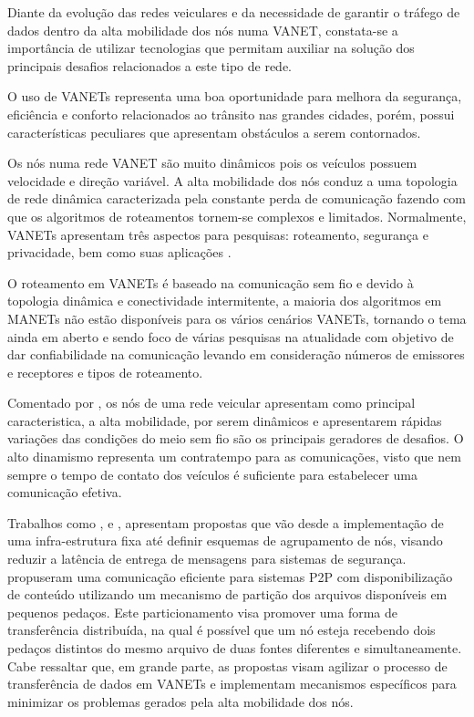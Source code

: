 \documentclass[
	12pt,				%
	oneside,			%
	a4paper,			%
	english,			%
	brazil				%
	]{abntex2ppgsi}
\begin{document}
Diante da evolução das redes veiculares e da necessidade de garantir o tráfego de dados dentro da alta mobilidade dos nós numa VANET, constata-se a importância de utilizar tecnologias que permitam auxiliar na solução dos principais desafios relacionados a este tipo de rede.  

O uso de VANETs representa uma boa oportunidade para melhora da segurança, eficiência e conforto relacionados ao trânsito nas grandes cidades, porém, possui características peculiares que apresentam obstáculos a serem contornados. 

Os nós numa rede VANET são muito dinâmicos pois os veículos possuem velocidade e direção variável. A alta mobilidade dos nós conduz a uma topologia de rede dinâmica caracterizada pela constante perda de comunicação fazendo com que os algoritmos de roteamentos tornem-se complexos e limitados. Normalmente, VANETs apresentam três aspectos para pesquisas: roteamento, segurança e privacidade, bem como suas aplicações \cite{liang2015vehicular}.

O roteamento em VANETs é baseado na comunicação sem fio e devido à topologia dinâmica e conectividade intermitente, a maioria dos algoritmos em MANETs não estão disponíveis para os vários cenários VANETs, tornando o tema ainda em aberto  e sendo foco de várias pesquisas na atualidade com objetivo de dar confiabilidade na comunicação levando em consideração números de emissores e receptores e tipos de roteamento.

Comentado por , os nós de uma rede veicular apresentam como principal caracteristica, a alta mobilidade, por serem dinâmicos e apresentarem rápidas variações das condições do meio sem fio são os principais geradores de desafios.  O alto dinamismo representa um contratempo para as comunicações, visto que nem sempre o tempo de contato dos veículos é suficiente para estabelecer uma comunicação efetiva.

Trabalhos como  ,  e , apresentam propostas que vão desde a implementação de uma infra-estrutura fixa até definir esquemas de agrupamento de nós, visando reduzir a latência de entrega de mensagens para sistemas de segurança.  propuseram uma comunicação eficiente para sistemas P2P com disponibilização de conteúdo utilizando um mecanismo de partição dos arquivos disponíveis em pequenos pedaços.  Este particionamento visa promover uma forma de transferência distribuída,  na qual é possível que um nó esteja recebendo dois pedaços distintos do mesmo arquivo de duas fontes diferentes e simultaneamente.  Cabe ressaltar que, em grande parte, as propostas visam agilizar o processo de transferência de dados em VANETs e implementam mecanismos específicos para minimizar os problemas gerados pela alta mobilidade dos nós.
\end{document}
